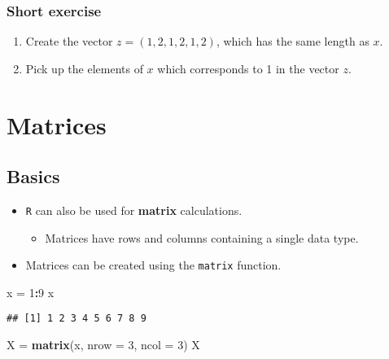 \documentclass[]{book}
\newenvironment{Shaded}{\begin{snugshade}}{\end{snugshade}}
\newcommand{\DataTypeTok}[1]{\textcolor[rgb]{0.13,0.29,0.53}{#1}}
\newcommand{\DecValTok}[1]{\textcolor[rgb]{0.00,0.00,0.81}{#1}}
\newcommand{\KeywordTok}[1]{\textcolor[rgb]{0.13,0.29,0.53}{\textbf{#1}}}
\newcommand{\NormalTok}[1]{#1}
\newcommand{\OperatorTok}[1]{\textcolor[rgb]{0.81,0.36,0.00}{\textbf{#1}}}
\newcommand{\StringTok}[1]{\textcolor[rgb]{0.31,0.60,0.02}{#1}}
\providecommand{\tightlist}{%
  \setlength{\itemsep}{0pt}\setlength{\parskip}{0pt}}
\begin{document}
\hypertarget{short-exercise}{%
\subsubsection{Short exercise}\label{short-exercise}}

\begin{enumerate}
\def\labelenumi{\arabic{enumi}.}
\tightlist
\item
  Create the vector \(z = (1,2,1,2,1,2)\), which has the same length as \(x\).
\item
  Pick up the elements of \(x\) which corresponds to 1 in the vector \(z\).
\end{enumerate}

\hypertarget{matrices}{%
\section{Matrices}\label{matrices}}

\hypertarget{basics}{%
\subsection{Basics}\label{basics}}

\begin{itemize}
\tightlist
\item
  \texttt{R} can also be used for \textbf{matrix} calculations.

  \begin{itemize}
  \tightlist
  \item
    Matrices have rows and columns containing a single data type.
  \end{itemize}
\item
  Matrices can be created using the \texttt{matrix} function.
\end{itemize}

\begin{Shaded}
\begin{Highlighting}[]
\NormalTok{x =}\StringTok{ }\DecValTok{1}\OperatorTok{:}\DecValTok{9}
\NormalTok{x}
\end{Highlighting}
\end{Shaded}

\begin{verbatim}
## [1] 1 2 3 4 5 6 7 8 9
\end{verbatim}

\begin{Shaded}
\begin{Highlighting}[]
\NormalTok{X =}\StringTok{ }\KeywordTok{matrix}\NormalTok{(x, }\DataTypeTok{nrow =} \DecValTok{3}\NormalTok{, }\DataTypeTok{ncol =} \DecValTok{3}\NormalTok{)}
\NormalTok{X}
\end{Highlighting}
\end{Shaded}
\end{document}
